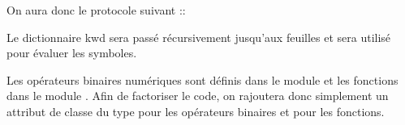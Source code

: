 \documentclass[letterpaper,10pt,english]{sphinxhowto}
\begin{document}
\begin{sphinxVerbatim}[commandchars=\\\{\}]
    
 
\end{sphinxVerbatim}

\sphinxAtStartPar
On aura donc le protocole suivant ::

\begin{sphinxVerbatim}[commandchars=\\\{\}]
  
\end{sphinxVerbatim}

\sphinxAtStartPar
Le dictionnaire kwd sera passé récursivement jusqu’aux feuilles et sera utilisé pour évaluer les symboles.

\sphinxAtStartPar
Les opérateurs binaires numériques sont définis dans le module  et les fonctions dans le module . Afin de factoriser le code, on rajoutera donc simplement un attribut de classe du type  pour les opérateurs binaires et  pour les fonctions.
\end{document}
